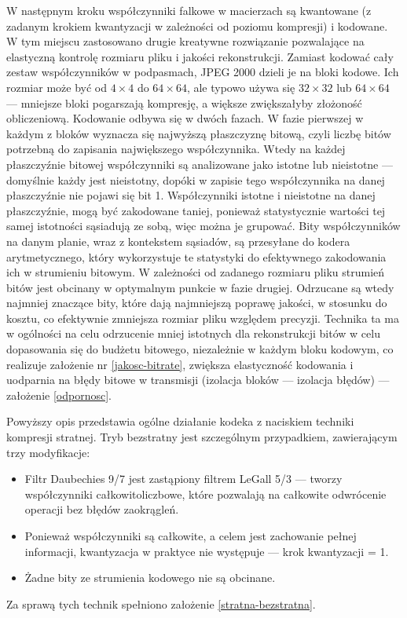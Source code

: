 W następnym kroku współczynniki falkowe w macierzach są kwantowane (z zadanym krokiem kwantyzacji w zależności od poziomu kompresji) i kodowane. W tym miejscu zastosowano drugie kreatywne rozwiązanie pozwalające na elastyczną kontrolę rozmiaru pliku i jakości rekonstrukcji. Zamiast kodować cały zestaw współczynników w podpasmach, JPEG 2000 dzieli je na bloki kodowe. Ich rozmiar może być od \(4 \times 4\) do \(64 \times 64\), ale typowo używa się \(32 \times 32\) lub \(64 \times 64\) --- mniejsze bloki pogarszają kompresję, a większe zwiększałyby złożoność obliczeniową. Kodowanie odbywa się w dwóch fazach. W fazie pierwszej w każdym z bloków wyznacza się najwyższą płaszczyznę bitową, czyli liczbę bitów potrzebną do zapisania największego współczynnika. Wtedy na każdej płaszczyźnie bitowej współczynniki są analizowane jako istotne lub nieistotne --- domyślnie każdy jest nieistotny, dopóki w zapisie tego współczynnika na danej płaszczyźnie nie pojawi się bit 1. Współczynniki istotne i nieistotne na danej płaszczyźnie, mogą być zakodowane taniej, ponieważ statystycznie wartości tej samej istotności sąsiadują ze sobą, więc można je grupować. Bity współczynników na danym planie, wraz z kontekstem sąsiadów, są przesyłane do kodera arytmetycznego, który wykorzystuje te statystyki do efektywnego zakodowania ich w strumieniu bitowym. W zależności od zadanego rozmiaru pliku strumień bitów jest obcinany w optymalnym punkcie w fazie drugiej. Odrzucane są wtedy najmniej znaczące bity, które dają najmniejszą poprawę jakości, w stosunku do kosztu, co efektywnie zmniejsza rozmiar pliku względem precyzji. Technika ta ma w ogólności na celu odrzucenie mniej istotnych dla rekonstrukcji bitów w celu dopasowania się do budżetu bitowego, niezależnie w każdym bloku kodowym, co realizuje założenie nr \ref{jakosc-bitrate}, zwiększa elastyczność kodowania i uodparnia na błędy bitowe w transmisji (izolacja bloków --- izolacja błędów) --- założenie \ref{odpornosc}.

Powyższy opis przedstawia ogólne działanie kodeka z naciskiem techniki kompresji stratnej. Tryb bezstratny jest szczególnym przypadkiem, zawierającym trzy modyfikacje:
\begin{itemize}
	\item Filtr Daubechies 9/7 jest zastąpiony filtrem LeGall 5/3 --- tworzy współczynniki całkowitoliczbowe, które pozwalają na całkowite odwrócenie operacji bez błędów zaokrągleń.
	\item Ponieważ współczynniki są całkowite, a celem jest zachowanie pełnej informacji, kwantyzacja w praktyce nie występuje --- krok kwantyzacji = 1.
	\item Żadne bity ze strumienia kodowego nie są obcinane.
\end{itemize}
Za sprawą tych technik spełniono założenie \ref{stratna-bezstratna}.

